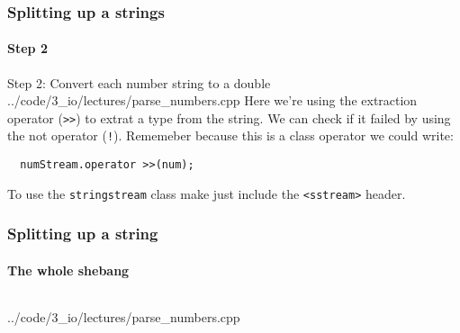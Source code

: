 \documentclass{beamer}
\begin{document}
\begin{frame}[fragile]
  \frametitle{Splitting up a strings}
  \framesubtitle{Step 2}
  
  \begin{block}{Step 2: Convert each number string to a double}
  		{../code/3_io/lectures/parse_numbers.cpp}
    Here we're using the extraction operator (\texttt{>>}) to extrat a  type from the string.\pause{} \newline
    We can check if it failed by using the not operator (\texttt{!}).  Rememeber because this is a class operator we could write:
    \begin{lstlisting}
  numStream.operator >>(num);
    \end{lstlisting}
	\end{block}
	To use the \texttt{stringstream} class make just include the \texttt{<sstream>} header.

\end{frame}

\begin{frame}[fragile]
  \frametitle{Splitting up a string}
  \framesubtitle{The whole shebang}
  \begin{columns}
    \begin{column}[T]{0.75\linewidth}
  			{../code/3_io/lectures/parse_numbers.cpp}
  	\end{column}
  	\begin{column}[T]{0.25\linewidth}
  	\end{column}
  \end{columns}  

\end{frame}
\end{document}
